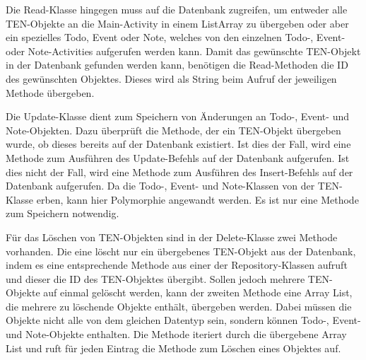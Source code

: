 Die Read-Klasse hingegen muss auf die Datenbank zugreifen, um entweder alle TEN-Objekte an die Main-Activity in einem ListArray zu übergeben oder aber ein spezielles Todo, Event oder Note, welches von den einzelnen Todo-, Event- oder Note-Activities aufgerufen werden kann. Damit das gewünschte TEN-Objekt in der Datenbank gefunden werden kann, benötigen die Read-Methoden die ID des gewünschten Objektes. Dieses wird als String beim Aufruf der jeweiligen Methode übergeben.

Die Update-Klasse dient zum Speichern von Änderungen an Todo-, Event- und Note-Objekten. Dazu überprüft die Methode, der ein TEN-Objekt übergeben wurde, ob dieses bereits auf der Datenbank existiert. Ist dies der Fall, wird eine Methode zum Ausführen des Update-Befehls auf der Datenbank aufgerufen. Ist dies nicht der Fall, wird eine Methode zum Ausführen des Insert-Befehls auf der Datenbank aufgerufen. Da die Todo-, Event- und Note-Klassen von der TEN-Klasse erben, kann hier Polymorphie angewandt werden. Es ist nur eine Methode zum Speichern notwendig.

Für das Löschen von TEN-Objekten sind in der Delete-Klasse zwei Methode vorhanden. Die eine löscht nur ein übergebenes TEN-Objekt aus der Datenbank, indem es eine entsprechende Methode aus einer der Repository-Klassen aufruft und dieser die ID des TEN-Objektes übergibt. Sollen jedoch mehrere TEN-Objekte auf einmal gelöscht werden, kann der zweiten Methode eine Array List, die mehrere zu löschende Objekte enthält, übergeben werden. Dabei müssen die Objekte nicht alle von dem gleichen Datentyp sein, sondern können Todo-, Event- und Note-Objekte enthalten. Die Methode iteriert durch die übergebene Array List und ruft für jeden Eintrag die Methode zum Löschen eines Objektes auf.


